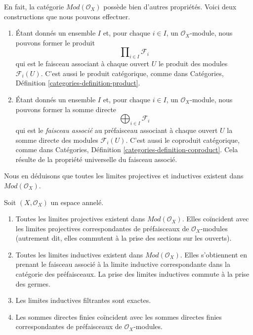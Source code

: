 \noindent
En fait, la catégorie $\textit{Mod}(\mathcal{O}_X)$ possède bien d'autres
propriétés. Voici deux constructions que nous pouvons effectuer.
\begin{enumerate}
\item Étant donnés un ensemble $I$ et, pour chaque $i \in I$, un
$\mathcal{O}_X$-module, nous pouvons former le produit
$$
\prod\nolimits_{i \in I} \mathcal{F}_i
$$
qui est le faisceau associant à chaque ouvert $U$ le produit des modules
$\mathcal{F}_i(U)$. C'est aussi le produit catégorique, comme dans Catégories,
Définition \ref{categories-definition-product}.
\item Étant donnés un ensemble $I$ et, pour chaque $i \in I$, un
$\mathcal{O}_X$-module, nous pouvons former la somme directe
$$
\bigoplus\nolimits_{i \in I} \mathcal{F}_i
$$
qui est le {\it faisceau associé} au préfaisceau associant à chaque ouvert
$U$ la somme directe des modules $\mathcal{F}_i(U)$. C'est aussi le coproduit
catégorique, comme dans Catégories, Définition
\ref{categories-definition-coproduct}. Cela résulte de la propriété
universelle du faisceau associé.
\end{enumerate}
Nous en déduisons que toutes les limites projectives et inductives existent
dans $\textit{Mod}(\mathcal{O}_X)$.

\begin{lemma}
\label{lemma-limits-colimits}
Soit $(X, \mathcal{O}_X)$ un espace annelé.
\begin{enumerate}
\item Toutes les limites projectives existent dans
$\textit{Mod}(\mathcal{O}_X)$. Elles coïncident avec les limites projectives
correspondantes de préfaisceaux de $\mathcal{O}_X$-modules (autrement dit,
elles commutent à la prise des sections sur les ouverts).
\item Toutes les limites inductives existent dans
$\textit{Mod}(\mathcal{O}_X)$. Elles s'obtiennent en prenant le faisceau
associé à la limite inductive correspondante dans la catégorie des
préfaisceaux. La prise des limites inductives commute à la prise des germes.
\item Les limites inductives filtrantes sont exactes.
\item Les sommes directes finies coïncident avec les sommes directes finies
correspondantes de préfaisceaux de $\mathcal{O}_X$-modules.
\end{enumerate}
\end{lemma}

